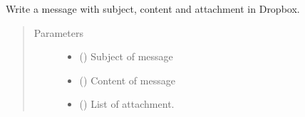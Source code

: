 \documentclass[letterpaper,10pt,english]{sphinxmanual}
\begin{document}

\begin{fulllineitems}
\label{\detokenize{NoSeMazeControl/HelperFunctions:HelperFunctions.Email.send}}
\pysigstartsignatures
{}
\pysigstopsignatures
\sphinxAtStartPar
Write a message with subject, content and attachment in Dropbox.
\begin{quote}\begin{description}
\item[{Parameters}] \leavevmode\begin{itemize}
\item {} 
\sphinxAtStartPar
{} () \textendash{} Subject of message

\item {} 
\sphinxAtStartPar
{} () \textendash{} Content of message

\item {} 
\sphinxAtStartPar
{} () \textendash{} List of attachment.

\end{itemize}

\end{description}\end{quote}

\end{fulllineitems}

\end{document}
